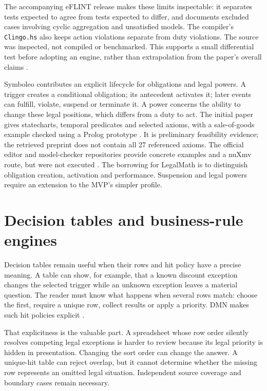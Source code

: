 The accompanying eFLINT release makes these limits inspectable: it separates
tests expected to agree from tests expected to differ, and documents excluded
cases involving cyclic aggregation and unsatisfied models. The compiler's
\texttt{Clingo.hs} also keeps action violations separate from duty violations.
The source was inspected, not compiled or benchmarked. This supports a small
differential test before adopting an engine, rather than extrapolation from the
paper's overall claims \citep{eflintartifact}.

Symboleo contributes an explicit lifecycle for obligations and legal powers.
A trigger creates a conditional obligation; its antecedent activates it; later
events can fulfill, violate, suspend or terminate it. A power concerns the ability
to change these legal positions, which differs from a duty to act. The initial
paper gives statecharts, temporal predicates and selected axioms, with a
sale-of-goods example checked using a Prolog prototype
\citep[secs.~III--IV]{symboleo2020}. It is preliminary feasibility evidence;
the retrieved preprint does not contain all 27 referenced axioms. The official
editor and model-checker repositories provide concrete examples and a nuXmv
route, but were not executed \citep{symboleocode}. The borrowing for LegalMath
is to distinguish obligation creation, activation and performance. Suspension
and legal powers require an extension to the MVP's simpler profile.

\section{Decision tables and business-rule engines}
\label{merge:M04:09}

\label{sec:languages-tables}
Decision tables remain useful when their rows and hit policy have a precise
meaning. A table can show, for example, that a known discount exception changes
the selected trigger while an unknown exception leaves a material question.
The reader must know what happens when several rows match: choose the first,
require a unique row, collect results or apply a priority. DMN makes such hit
policies explicit \citep[sec.~8.2.11]{dmn2024}.

That explicitness is the valuable part. A spreadsheet whose row order silently
resolves competing legal exceptions is harder to review because its legal
priority is hidden in presentation. Changing the sort order can change the
answer. A unique-hit table can reject overlap, but it cannot determine whether
the missing row represents an omitted legal situation. Independent source
coverage and boundary cases remain necessary.

